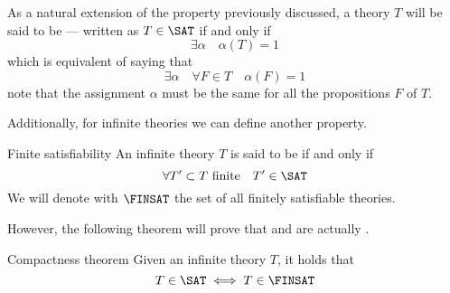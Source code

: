 \documentclass[a4paper, 12pt]{report}
\begin{document}
    As a natural extension of the  property previously discussed, a theory $T$ will be said to be  --- written as $T \in \SAT$ if and only if $$\exists \alpha \quad \alpha(T) = 1$$ which is equivalent of saying that $$\exists \alpha \quad \forall F \in T \quad \alpha (F) = 1$$ note that the assignment $\alpha$ must be the same for all the propositions $F$ of $T$.

    Additionally, for infinite theories we can define another property.

    \begin{frameddefn}{Finite satisfiability}
        An infinite theory $T$ is said to be  if and only if $$\forall T' \subset T \ \mathrm{finite} \quad T' \in \SAT$$ We will denote with $\FINSAT$ the set of all finitely satisfiable theories.
    \end{frameddefn}
    
    However, the following theorem will prove that  and  are actually .

    \begin{framedthm}{Compactness theorem}
        Given an infinite theory $T$, it holds that $$T \in \SAT \iff T \in \FINSAT$$
    \end{framedthm}
\end{document}
